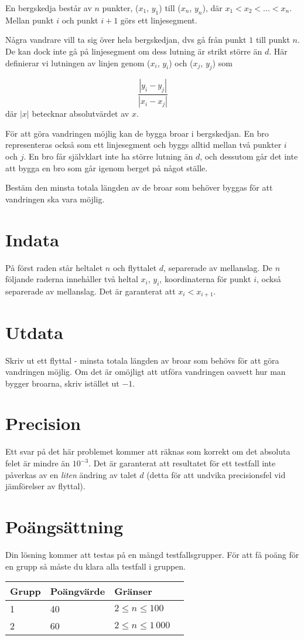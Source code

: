 En bergskedja består av $n$ punkter, ($x_1$, $y_1$) till ($x_n$, $y_n$), där $x_1 < x_2 < ... < x_n$. Mellan punkt $i$ och punkt $i+1$ görs ett linjesegment.

Några vandrare vill ta sig över hela bergskedjan, dvs gå från punkt $1$ till punkt $n$. De kan dock inte gå på linjesegment om dess lutning är strikt större än $d$. Här definierar vi lutningen av linjen genom ($x_i$, $y_i$) och ($x_j$, $y_j$) som

$$
\frac{|y_i - y_j|}{|x_i - x_j|}
$$
där $|x|$ betecknar absolutvärdet av $x$.

För att göra vandringen möjlig kan de bygga broar i bergskedjan. En bro representeras också som ett linjesegment och byggs alltid mellan två punkter $i$ och $j$. En bro får självklart inte ha större lutning än $d$, och dessutom går det inte att bygga en bro som går igenom berget på något ställe.

Bestäm den minsta totala längden av de broar som behöver byggas för att vandringen ska vara möjlig.

\section*{Indata}
På först raden står heltalet $n$ och flyttalet $d$, separerade av mellanslag.
De $n$ följande raderna innehåller två heltal $x_i$, $y_i$, koordinaterna för punkt $i$, också separerade av mellanslag. Det är garanterat att $x_i < x_{i+1}$.

\section*{Utdata}
Skriv ut ett flyttal - minsta totala längden av broar som behövs för att göra vandringen möjlig.
Om det är omöjligt att utföra vandringen oavsett hur man bygger broarna, skriv istället ut $-1$.

\section*{Precision}
Ett svar på det här problemet kommer att räknas som korrekt om det absoluta felet är mindre än $10^{-3}$. Det är garanterat att resultatet för ett testfall inte påverkas av en \emph{liten} ändring av talet $d$ (detta för att undvika precisionsfel vid jämförelser av flyttal).

\section*{Poängsättning}

Din lösning kommer att testas på en mängd testfallsgrupper. För att få poäng för en grupp
så måste du klara alla testfall i gruppen.

\begin{tabular}{| l | l | l | l |}
\hline
Grupp & Poängvärde & Gränser \\ \hline
1     & 40         & $ 2 \le n \le 100$ \\ \hline
2     & 60         & $ 2 \le n \le 1\,000$ \\ \hline
\end{tabular}
